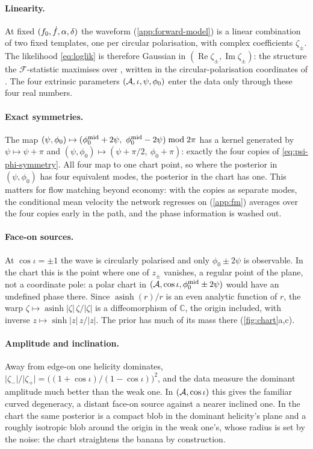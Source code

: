 \paragraph{Linearity.}
At fixed $(f_0, \dot f, \alpha, \delta)$ the waveform (\cref{app:forward-model}) is a linear
combination of two fixed templates, one per circular polarisation, with complex coefficients
$\zeta_\pm$. The likelihood \cref{eq:loglik} is therefore Gaussian in
$(\operatorname{Re}\zeta_\pm, \operatorname{Im}\zeta_\pm)$: the structure the
$\mathcal F$-statistic maximises over \citep{jaranowski1998data}, written in the
circular-polarisation coordinates of \citet{whelan2014new}. The four extrinsic parameters
$(\mathcal{A}, \iota, \psi, \phi_0)$ enter the data only through these four real numbers.

\paragraph{Exact symmetries.}
The map $(\psi,\phi_0)\mapsto(\phi_0^{\rm mid}+2\psi,\ \phi_0^{\rm mid}-2\psi) \bmod 2\pi$ has a kernel
generated by $\psi\mapsto\psi+\pi$ and $(\psi,\phi_0)\mapsto(\psi+\pi/2,\ \phi_0+\pi)$: exactly
the four copies of \cref{eq:psi-phi-symmetry}. All four map to one chart point, so where the
posterior in $(\psi,\phi_0)$ has four equivalent modes, the posterior in the chart has one. This
matters for flow matching beyond economy: with the copies as separate modes, the conditional
mean velocity the network regresses on (\cref{app:fm}) averages over the four copies early in
the path, and the phase information is washed out.

\paragraph{Face-on sources.}
At $\cos\iota=\pm1$ the wave is circularly polarised and only $\phi_0\pm2\psi$ is observable.
In the chart this is the point where one of $z_\pm$ vanishes, a regular point of the plane, not
a coordinate pole: a polar chart in $(\mathcal{A}, \cos\iota, \phi_0^{\rm mid}\pm2\psi)$ would have an
undefined phase there. Since $\operatorname{asinh}(r)/r$ is an even analytic function of $r$,
the warp $\zeta\mapsto\operatorname{asinh}\lvert\zeta\rvert\,\zeta/\lvert\zeta\rvert$ is a
diffeomorphism of $\mathbb C$, the origin included, with inverse
$z\mapsto\sinh\lvert z\rvert\,z/\lvert z\rvert$. The prior has much of its mass there
(\cref{fig:chart}a,c).

\paragraph{Amplitude and inclination.}
Away from edge-on one helicity dominates,
$\lvert\zeta_-\rvert/\lvert\zeta_+\rvert = \bigl((1+\cos\iota)/(1-\cos\iota)\bigr)^2$, and the
data measure the dominant amplitude much better than the weak one. In $(\mathcal{A},\cos\iota)$ this
gives the familiar curved degeneracy, a distant face-on source against a nearer inclined one.
In the chart the same posterior is a compact blob in the dominant helicity's
plane and a roughly isotropic blob around the origin in the weak one's, whose radius is set by
the noise: the chart straightens the banana by construction.

